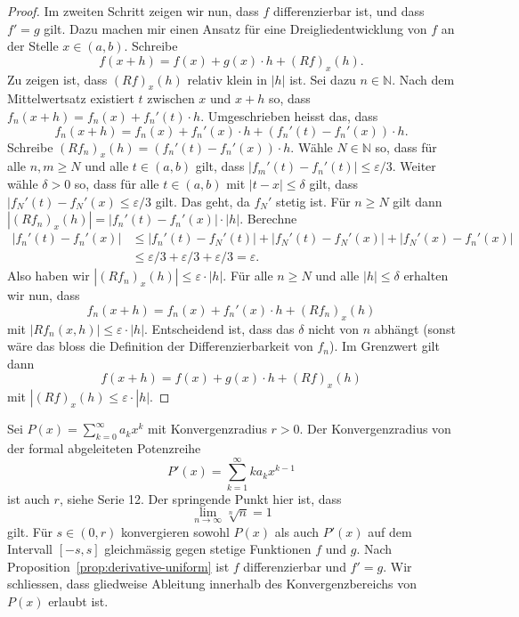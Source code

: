 \documentclass[../main.tex]{subfiles}
\begin{document}
\begin{proof}
  Im zweiten Schritt zeigen wir nun, dass $f$ differenzierbar ist, und
  dass $f' = g$ gilt.
  Dazu machen mir einen Ansatz für eine Dreigliedentwicklung von $f$
  an der Stelle $x \in (a, b)$. Schreibe
  \[
    f(x + h) = f(x) + g(x) \cdot h + {(Rf)}_x(h).
  \]
  Zu zeigen ist, dass ${(Rf)}_x(h)$ relativ klein in $|h|$ ist.
  Sei dazu $n \in \mathbb{N}$.
  Nach dem Mittelwertsatz existiert $t$ zwischen $x$ und $x + h$ 
  so, dass $f_n(x + h) = f_n(x) + f_n'(t) \cdot h$.
  Umgeschrieben heisst das, dass
  \[
    f_n(x + h) = f_n(x) + f_n'(x) \cdot h + (f_n'(t) - f_n'(x)) \cdot h.
  \]
  Schreibe ${(Rf_n)}_x(h) = (f_n'(t) - f_n'(x)) \cdot h$.
  Wähle $N \in \mathbb{N}$ so, dass für alle $n, m \geq N$ und alle
  $t \in (a, b)$ gilt, dass $|f_m'(t) - f_n'(t)| \leq \varepsilon/3$.
  Weiter wähle $\delta > 0$ so, dass für alle $t \in (a, b)$ mit
  $|t - x| \leq \delta$ gilt, dass
  $|f_N'(t) - f_N'(x) \leq \varepsilon/3$ gilt. Das geht, da $f_N'$ stetig ist.
  Für $n \geq N$ gilt dann
  $|{(Rf_n)}_x(h)| = |f_n'(t) - f_n'(x)| \cdot |h|$.
  Berechne
  \begin{align*}
    |f_n'(t) - f_n'(x)|
    & \leq |f_n'(t) - f_N'(t)| + |f_N'(t) - f_N'(x)| + |f_N'(x) - f_n'(x)|\\
    &\leq \varepsilon/3 + \varepsilon/3 + \varepsilon/3 = \varepsilon.
  \end{align*}
  Also haben wir
  \(
    |{(Rf_n)}_{x}(h)| \leq \varepsilon \cdot |h|
  \).
  Für alle $n \geq N$ und alle $|h| \leq \delta$ erhalten wir nun, dass
  \[
    f_n(x + h) = f_n(x) + f_n'(x) \cdot h + {(Rf_n)}_x(h)
  \]
  mit $|Rf_n(x, h)| \leq \varepsilon \cdot |h|$.
  Entscheidend ist, dass das $\delta$ nicht von $n$ abhängt (sonst wäre das
  bloss die Definition der Differenzierbarkeit von $f_n$).
  Im Grenzwert gilt dann
  \[
    f(x + h) = f(x) + g(x) \cdot h + {(Rf)}_x(h)
  \]
  mit $|{(Rf)}_x(h) \leq \varepsilon \cdot |h|$.
\end{proof}

\begin{application}
  Sei $P(x) = \sum_{k=0}^{\infty} a_k x^k$ mit Konvergenzradius $r > 0$.
  Der Konvergenzradius von der formal abgeleiteten Potenzreihe
  \[
    P'(x) = \sum_{k=1}^{\infty} k a_k x^{k-1}
  \]
  ist auch $r$, siehe Serie 12.
  Der springende Punkt hier ist, dass
  \[
    \lim_{n \to \infty} \sqrt[n]{n} = 1
  \]
  gilt. Für $s \in (0, r)$ konvergieren sowohl $P(x)$ als auch
  $P'(x)$ auf dem Intervall $[-s, s]$ gleichmässig gegen stetige Funktionen
  $f$ und $g$.
  Nach Proposition~\ref{prop:derivative-uniform} ist $f$ differenzierbar
  und $f' = g$.
  Wir schliessen, dass gliedweise Ableitung innerhalb des Konvergenzbereichs von
  $P(x)$ erlaubt ist.
\end{application}
\end{document}
